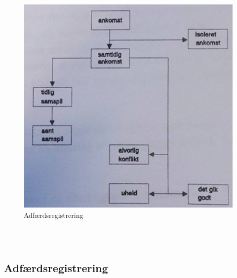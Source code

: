 \begin{figure}[htbp]
  \label{fig:adfreg}
  \centering
  \begin{adjustbox}{max width=\textwidth}
    \includegraphics[scale=0.7]{billederogfigur/adfaerdsreg.png} %
 \end{adjustbox}
  \caption{Adfærdsregistrering}
\end{figure}
\\\
\subsection{Adfærdsregistrering}
\label{sub:adfregis}

